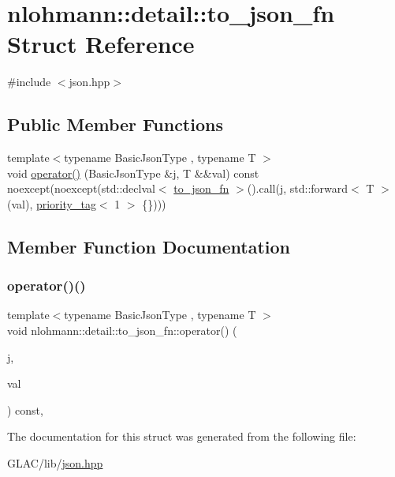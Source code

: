 \hypertarget{structnlohmann_1_1detail_1_1to__json__fn}{}\section{nlohmann\+::detail\+::to\+\_\+json\+\_\+fn Struct Reference}
\label{structnlohmann_1_1detail_1_1to__json__fn}


{\ttfamily \#include $<$json.\+hpp$>$}

\subsection*{Public Member Functions}
\begin{DoxyCompactItemize}
\item 
{\footnotesize template$<$typename Basic\+Json\+Type , typename T $>$ }\\void \mbox{\hyperlink{structnlohmann_1_1detail_1_1to__json__fn_ac63f82d3eed085522f1cbe99a521a4d4}{operator()}} (Basic\+Json\+Type \&j, T \&\&val) const noexcept(noexcept(std\+::declval$<$ \mbox{\hyperlink{structnlohmann_1_1detail_1_1to__json__fn}{to\+\_\+json\+\_\+fn}} $>$().call(j, std\+::forward$<$ T $>$(val), \mbox{\hyperlink{structnlohmann_1_1detail_1_1priority__tag}{priority\+\_\+tag}}$<$ 1 $>$ \{\})))
\end{DoxyCompactItemize}


\subsection{Member Function Documentation}
\mbox{\label{structnlohmann_1_1detail_1_1to__json__fn_ac63f82d3eed085522f1cbe99a521a4d4}} 
\subsubsection{\texorpdfstring{operator()()}{operator()()}}
{\footnotesize\ttfamily template$<$typename Basic\+Json\+Type , typename T $>$ \\
void nlohmann\+::detail\+::to\+\_\+json\+\_\+fn\+::operator() (\begin{DoxyParamCaption}\item[{Basic\+Json\+Type \&}]{j,  }\item[{T \&\&}]{val }\end{DoxyParamCaption}) const\hspace{0.3cm}{\ttfamily [inline]}, {\ttfamily [noexcept]}}



The documentation for this struct was generated from the following file\+:\begin{DoxyCompactItemize}
\item 
G\+L\+A\+C/lib/\mbox{\hyperlink{json_8hpp}{json.\+hpp}}\end{DoxyCompactItemize}

